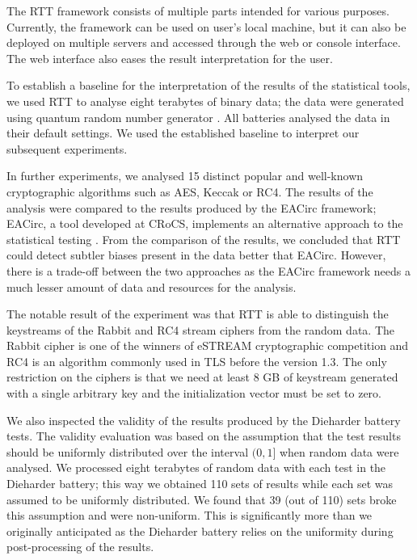 \documentclass[
	digital,    %
	oneside,    %
	color,
	11pt,
	nocover,
	notable,
	nolof,
	nolot,
]{fithesis3}
\theoremstyle{definition}
\theoremstyle{remark}
\begin{document}
The RTT framework consists of multiple parts intended for various purposes. Currently, the framework can be used on user's local machine, but it can also be deployed on multiple servers and accessed through the web or console interface. The web interface also eases the result interpretation for the user.

To establish a baseline for the interpretation of the results of the statistical tools, we used RTT to analyse eight terabytes of binary data; the data were generated using quantum random number generator \cite{qrng-service-germany}. All batteries analysed the data in their default settings. We used the established baseline to interpret our subsequent experiments. 

In further experiments, we analysed 15 distinct popular and well-known cryptographic algorithms such as AES, Keccak or RC4. The results of the analysis were compared to the results produced by the EACirc framework; EACirc, a tool developed at CRoCS, implements an alternative approach to the statistical testing \cite{eacirc-github}. From the comparison of the results, we concluded that RTT could detect subtler biases present in the data better that EACirc. However, there is a trade-off between the two approaches as the EACirc framework needs a much lesser amount of data and resources for the analysis. 

The notable result of the experiment was that RTT is able to distinguish the keystreams of the Rabbit \cite{rabbit} and RC4 \cite{rc4} stream ciphers from the random data. The Rabbit cipher is one of the winners of eSTREAM \cite{estream-competition} cryptographic competition and RC4 is an algorithm commonly used in TLS before the version 1.3. The only restriction on the ciphers is that we need at least 8 GB of keystream generated with a single arbitrary key and the initialization vector must be set to zero.

We also inspected the validity of the results produced by the Dieharder battery tests. The validity evaluation was based on the assumption that the test results should be uniformly distributed over the interval $(0,1]$ when random data were analysed. We processed eight terabytes of random data with each test in the Dieharder battery; this way we obtained 110 sets of results while each set was assumed to be uniformly distributed. We found that 39 (out of 110) sets broke this assumption and were non-uniform. This is significantly more than we originally anticipated as the Dieharder battery relies on the uniformity during post-processing of the results.
\end{document}

